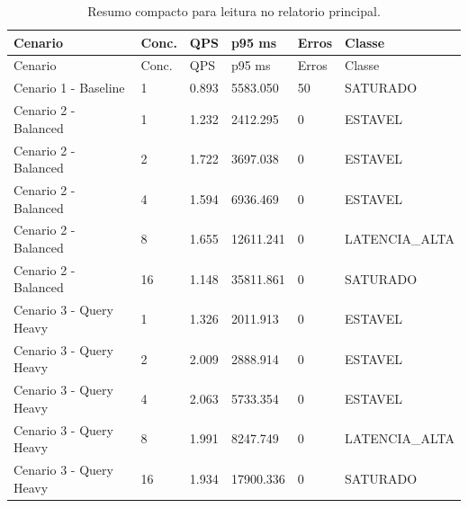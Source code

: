 {
\small
\setlength{\tabcolsep}{4pt}
\renewcommand{\arraystretch}{1.15}
\begin{longtable}{p{}p{}p{}p{}p{}p{}}
\caption{Resumo compacto para leitura no relatorio principal.}\\
\toprule
Cenario & Conc. & QPS & p95 ms & Erros & Classe \\
\midrule
\endfirsthead
\toprule
Cenario & Conc. & QPS & p95 ms & Erros & Classe \\
\midrule
\endhead
Cenario 1 - Baseline & 1 & 0.893 & 5583.050 & 50 & SATURADO \\
Cenario 2 - Balanced & 1 & 1.232 & 2412.295 & 0 & ESTAVEL \\
Cenario 2 - Balanced & 2 & 1.722 & 3697.038 & 0 & ESTAVEL \\
Cenario 2 - Balanced & 4 & 1.594 & 6936.469 & 0 & ESTAVEL \\
Cenario 2 - Balanced & 8 & 1.655 & 12611.241 & 0 & LATENCIA\_ALTA \\
Cenario 2 - Balanced & 16 & 1.148 & 35811.861 & 0 & SATURADO \\
Cenario 3 - Query Heavy & 1 & 1.326 & 2011.913 & 0 & ESTAVEL \\
Cenario 3 - Query Heavy & 2 & 2.009 & 2888.914 & 0 & ESTAVEL \\
Cenario 3 - Query Heavy & 4 & 2.063 & 5733.354 & 0 & ESTAVEL \\
Cenario 3 - Query Heavy & 8 & 1.991 & 8247.749 & 0 & LATENCIA\_ALTA \\
Cenario 3 - Query Heavy & 16 & 1.934 & 17900.336 & 0 & SATURADO \\
\bottomrule
\end{longtable}
}
